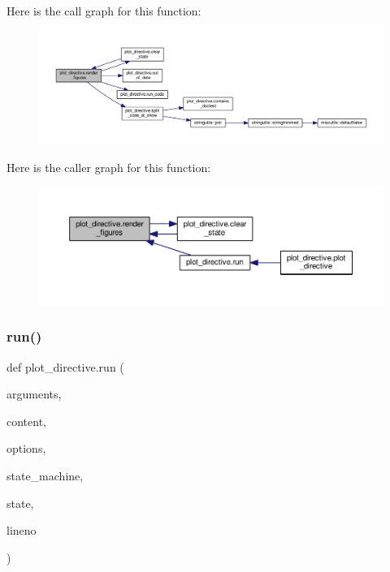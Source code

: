 Here is the call graph for this function\+:
\nopagebreak
\begin{figure}[H]
\begin{center}
\leavevmode
\includegraphics[width=350pt]{namespaceplot__directive_a659cae721da23d794cb3967690a166db_cgraph}
\end{center}
\end{figure}
Here is the caller graph for this function\+:
\nopagebreak
\begin{figure}[H]
\begin{center}
\leavevmode
\includegraphics[width=350pt]{namespaceplot__directive_a659cae721da23d794cb3967690a166db_icgraph}
\end{center}
\end{figure}
\mbox{\label{namespaceplot__directive_a978468d13700c2d59e021ffcd98820b5}} 
\subsubsection{\texorpdfstring{run()}{run()}}
{\footnotesize\ttfamily def plot\+\_\+directive.\+run (\begin{DoxyParamCaption}\item[{}]{arguments,  }\item[{}]{content,  }\item[{}]{options,  }\item[{}]{state\+\_\+machine,  }\item[{}]{state,  }\item[{}]{lineno }\end{DoxyParamCaption})}



